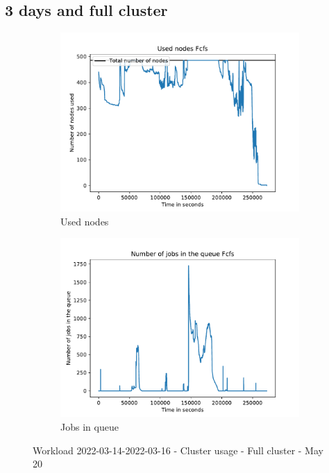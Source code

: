 \documentclass[a4paper]{article}
\begin{document}
	\subsection{3 days and full cluster}
	\begin{figure}[H]\centering
	\begin{subfigure}[b]{0.4\linewidth}\centering\includegraphics[width=1\linewidth]{MBSS/plot/2022-03-14->2022-03-16_Fcfs_Used_nodes_450_128_32_256_4_1024.pdf}\caption{Used nodes}\end{subfigure}
	\begin{subfigure}[b]{0.4\linewidth}\centering\includegraphics[width=1\linewidth]{MBSS/plot/2022-03-14->2022-03-16_Fcfs_Nb_scheduled_jobs_450_128_32_256_4_1024.pdf}\caption{Jobs in queue}\end{subfigure}
	\caption{Workload 2022-03-14-2022-03-16 - Cluster usage - Full cluster - May 20}\end{figure}
	
\end{document}
